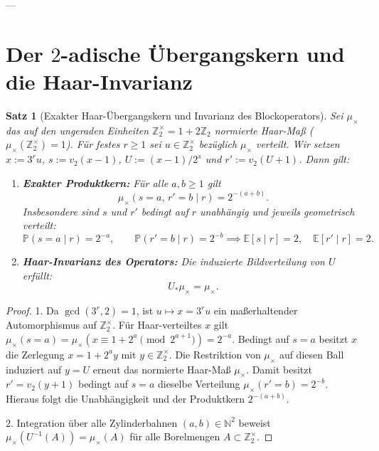 \documentclass[11pt,reqno]{amsart}
\newtheorem{theorem}{Satz}[section]
\theoremstyle{definition}
\theoremstyle{remark}
\numberwithin{equation}{section}
\begin{document}
---

\section{Der $2$-adische Übergangskern und die Haar-Invarianz}

\begin{theorem}[Exakter Haar-Übergangskern und Invarianz des Blockoperators]
\label{thm:haar_block_kernel}
Sei $\mu_\times$ das auf den ungeraden Einheiten $\mathbb{Z}_2^\times = 1 + 2\mathbb{Z}_2$ normierte Haar-Maß ($\mu_\times(\mathbb{Z}_2^\times) = 1$). 
Für festes $r \ge 1$ sei $u \in \mathbb{Z}_2^\times$ bezüglich $\mu_\times$ verteilt. Wir setzen $x := 3^r u$, $s := v_2(x - 1)$, $U := (x - 1)/2^s$ und $r' := v_2(U + 1)$. Dann gilt:
\begin{enumerate}
\item \textbf{Exakter Produktkern:} Für alle $a, b \ge 1$ gilt
\begin{equation}
\mu_\times(s = a, \, r' = b \mid r) = 2^{-(a+b)}.
\label{eq:haar_transition_kernel}
\end{equation}
Insbesondere sind $s$ und $r'$ bedingt auf $r$ unabhängig und jeweils geometrisch verteilt:
\begin{equation}
\mathbb{P}(s = a \mid r) = 2^{-a}, \qquad \mathbb{P}(r' = b \mid r) = 2^{-b} \implies \mathbb{E}[s \mid r] = 2, \quad \mathbb{E}[r' \mid r] = 2.
\end{equation}
\item \textbf{Haar-Invarianz des Operators:} Die induzierte Bildverteilung von $U$ erfüllt:
\begin{equation}
U_* \mu_\times = \mu_\times.
\end{equation}
\end{enumerate}
\end{theorem}

\begin{proof}
1. Da $\gcd(3^r, 2) = 1$, ist $u \mapsto x = 3^r u$ ein maßerhaltender Automorphismus auf $\mathbb{Z}_2^\times$. Für Haar-verteiltes $x$ gilt $\mu_\times(s = a) = \mu_\times(x \equiv 1 + 2^a \pmod{2^{a+1}}) = 2^{-a}$. 
Bedingt auf $s = a$ besitzt $x$ die Zerlegung $x = 1 + 2^a y$ mit $y \in \mathbb{Z}_2^\times$. Die Restriktion von $\mu_\times$ auf diesen Ball induziert auf $y = U$ erneut das normierte Haar-Maß $\mu_\times$. 
Damit besitzt $r' = v_2(y+1)$ bedingt auf $s = a$ dieselbe Verteilung $\mu_\times(r' = b) = 2^{-b}$. Hieraus folgt die Unabhängigkeit und der Produktkern $2^{-(a+b)}$.

2. Integration über alle Zylinderbahnen $(a, b) \in \mathbb{N}^2$ beweist $\mu_\times(U^{-1}(A)) = \mu_\times(A)$ für alle Borelmengen $A \subset \mathbb{Z}_2^\times$.
\end{proof}
\end{document}
